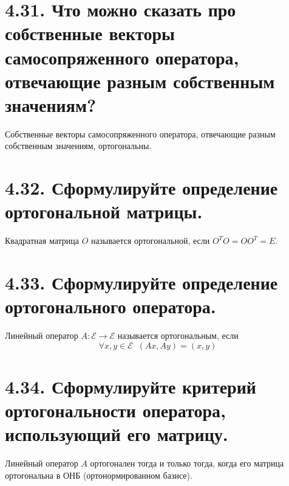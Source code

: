 \documentclass{article}
\begin{document}
\section*{\LARGE 4.31. Что можно сказать про собственные векторы самосопряженного оператора, отвечающие разным собственным значениям?}
Собственные векторы самосопряженного оператора, отвечающие разным собственным значениям, ортогональны.

\section*{\LARGE 4.32. Сформулируйте определение ортогональной матрицы.}
Квадратная матрица $O$ называется ортогональной, если $O^TO = OO^T = E$.

\section*{\LARGE 4.33. Сформулируйте определение ортогонального оператора.}
Линейный оператор $A : \mathcal{E} \rightarrow \mathcal{E}$ называется ортогональным, если $$\forall x,y \in \mathcal{E}\;\; (Ax, Ay) = (x, y)$$

\section*{\LARGE 4.34. Сформулируйте критерий ортогональности оператора, использующий его матрицу.}
Линейный оператор $A$ ортогонален тогда и только тогда, когда его матрица ортогональна в ОНБ (ортонормированном базисе).

\end{document}
